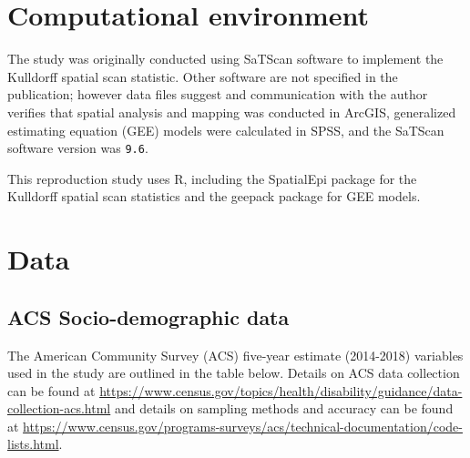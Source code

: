 \documentclass[
]{article}
\begin{document}
\hypertarget{computational-environment}{%
\section{Computational environment}\label{computational-environment}}

The study was originally conducted using SaTScan software to implement
the Kulldorff spatial scan statistic. Other software are not specified
in the publication; however data files suggest and communication with
the author verifies that spatial analysis and mapping was conducted in
ArcGIS, generalized estimating equation (GEE) models were calculated in
SPSS, and the SaTScan software version was \texttt{9.6}.

This reproduction study uses R, including the SpatialEpi package for the
Kulldorff spatial scan statistics and the geepack package for GEE
models.

\hypertarget{data}{%
\section{Data}\label{data}}

\hypertarget{acs-socio-demographic-data}{%
\subsection{ACS Socio-demographic
data}\label{acs-socio-demographic-data}}

The American Community Survey (ACS) five-year estimate (2014-2018)
variables used in the study are outlined in the table below. Details on
ACS data collection can be found at
\url{https://www.census.gov/topics/health/disability/guidance/data-collection-acs.html}
and details on sampling methods and accuracy can be found at
\url{https://www.census.gov/programs-surveys/acs/technical-documentation/code-lists.html}.
\end{document}
